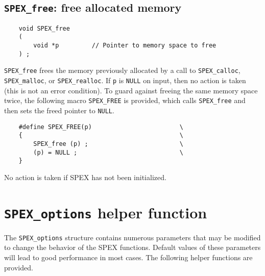 \documentclass[12pt,oneside]{book}
\theoremstyle{definition}
\begin{document}
\newpage
\subsection{\texttt{SPEX\_free}: free allocated memory} \label{ss:SPEX_free}
\begin{mdframed}[userdefinedwidth=\textwidth]
{\footnotesize
\begin{verbatim}
    void SPEX_free
    (
        void *p         // Pointer to memory space to free
    ) ;
\end{verbatim}
} \end{mdframed}

\verb|SPEX_free| frees the memory previously allocated by a call to
\verb|SPEX_calloc|, \verb|SPEX_malloc|, or \verb|SPEX_realloc|.  If \verb|p| is
\verb|NULL| on input, then no action is taken (this is not an error condition).
To guard against freeing the same memory space twice, the following macro
\verb|SPEX_FREE| is provided, which calls \verb|SPEX_free| and then sets the
freed pointer to \verb|NULL|.

\begin{mdframed}[userdefinedwidth=\textwidth]
{\footnotesize
\begin{verbatim}
    #define SPEX_FREE(p)                        \
    {                                           \
        SPEX_free (p) ;                         \
        (p) = NULL ;                            \
    }
\end{verbatim}
} \end{mdframed}

No action is taken if SPEX has not been initialized.


\section{\texttt{SPEX\_options} helper function} \label{ss:SPEX_options}
The \verb|SPEX_options| structure contains numerous parameters that may be
modified to change the behavior of the SPEX functions.  Default values of
these parameters will lead to good performance in most cases. The following helper functions
are provided.
\end{document}
